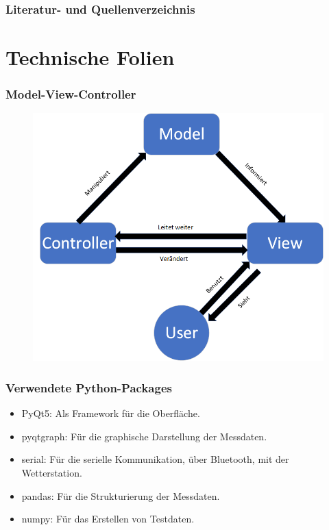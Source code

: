 \documentclass{beamer}
\begin{document}

\begin{frame}[allowframebreaks]
  \frametitle{Literatur- und Quellenverzeichnis}
   
\end{frame}

\section{Technische Folien}

\begin{frame}
  \frametitle{Model-View-Controller}
  \begin{figure}[H]
    \centering \includegraphics[width=.7\textwidth]{./img/MVC.png}
  \end{figure}
\end{frame}

\begin{frame}
  \frametitle{Verwendete Python-Packages}
  \begin{itemize}
  \item PyQt5: Als Framework für die Oberfläche.
  \item pyqtgraph: Für die graphische Darstellung der Messdaten.
  \item serial: Für die serielle Kommunikation, über Bluetooth, mit
    der Wetterstation.
  \item pandas: Für die Strukturierung der Messdaten.
  \item numpy: Für das Erstellen von Testdaten.
  \end{itemize}

\end{frame}
\end{document}
